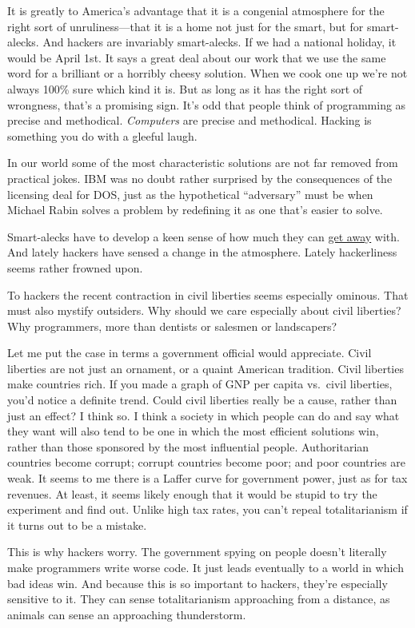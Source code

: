 It is greatly to America's advantage that it is a congenial atmosphere
for the right sort of unruliness---that it is a home not just for the
smart, but for smart-alecks. And hackers are invariably smart-alecks. If
we had a national holiday, it would be April 1st. It says a great deal
about our work that we use the same word for a brilliant or a horribly
cheesy solution. When we cook one up we're not always 100\% sure which
kind it is. But as long as it has the right sort of wrongness, that's a
promising sign. It's odd that people think of programming as precise and
methodical. \emph{Computers} are precise and methodical. Hacking is
something you do with a gleeful laugh.

In our world some of the most characteristic solutions are not far
removed from practical jokes. IBM was no doubt rather surprised by the
consequences of the licensing deal for DOS, just as the hypothetical
``adversary'' must be when Michael Rabin solves a problem by redefining
it as one that's easier to solve.

Smart-alecks have to develop a keen sense of how much they can
\href{say.html}{get away} with. And lately hackers have sensed a change
in the atmosphere. Lately hackerliness seems rather frowned upon.

To hackers the recent contraction in civil liberties seems especially
ominous. That must also mystify outsiders. Why should we care especially
about civil liberties? Why programmers, more than dentists or salesmen
or landscapers?

Let me put the case in terms a government official would appreciate.
Civil liberties are not just an ornament, or a quaint American
tradition. Civil liberties make countries rich. If you made a graph of
GNP per capita vs.~civil liberties, you'd notice a definite trend. Could
civil liberties really be a cause, rather than just an effect? I think
so. I think a society in which people can do and say what they want will
also tend to be one in which the most efficient solutions win, rather
than those sponsored by the most influential people. Authoritarian
countries become corrupt; corrupt countries become poor; and poor
countries are weak. It seems to me there is a Laffer curve for
government power, just as for tax revenues. At least, it seems likely
enough that it would be stupid to try the experiment and find out.
Unlike high tax rates, you can't repeal totalitarianism if it turns out
to be a mistake.

This is why hackers worry. The government spying on people doesn't
literally make programmers write worse code. It just leads eventually to
a world in which bad ideas win. And because this is so important to
hackers, they're especially sensitive to it. They can sense
totalitarianism approaching from a distance, as animals can sense an
approaching thunderstorm.

